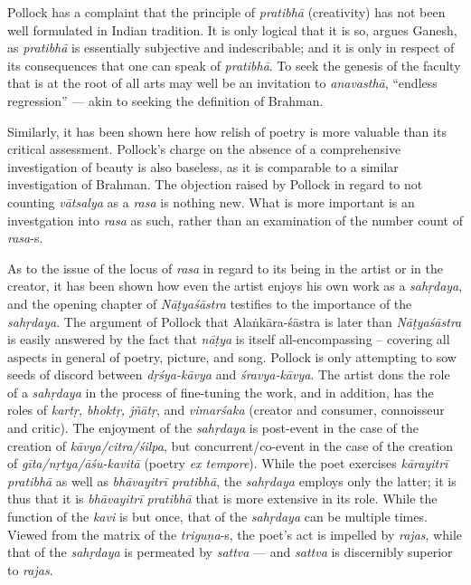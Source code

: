 Pollock has a complaint that the principle of \textsl{pratibhā} (creativity) has not been well formulated in Indian tradition. It is only logical that it is so, argues Ganesh, as \textsl{pratibhā} is essentially subjective and indescribable; and it is only in respect of its consequences that one can speak of \textsl{pratibhā}. To seek the genesis of the faculty that is at the root of all arts may well be an invitation to \textsl{anavasthā}, “endless regression” --- akin to seeking the definition of Brahman. 

Similarly, it has been shown here how relish of poetry is more valuable than its critical assessment. Pollock’s charge on the absence of a comprehensive investigation of beauty is also baseless, as it is comparable to a similar investigation of Brahman. The objection raised by Pollock in regard to not counting \textsl{vātsalya} as a \textsl{rasa} is nothing new. What is more important is an investgation into \textsl{rasa} as such, rather than an examination of the number count of \textsl{rasa}-s.

As to the issue of the locus of \textsl{rasa} in regard to its being in the artist or in the creator, it has been shown how even the artist enjoys his own work as a \textsl{sahṛdaya}, and the opening chapter of \textsl{Nāṭyaśāstra} testifies to the importance of the \textsl{sahṛdaya}. The argument of Pollock that Alaṅkāra-śāstra is later than \textsl{Nāṭyaśāstra} is easily answered by the fact that \textsl{nāṭya} is itself all-encompassing -- covering all aspects in general of poetry, picture, and song. Pollock is only attempting to sow seeds of discord between \textsl{dṛśya-kāvya} and \textsl{śravya-kāvya}. The artist dons the role of a \textsl{sahṛdaya} in the process of fine-tuning the work, and in addition, has the roles of \textsl{kartṛ, bhoktṛ, jñātṛ}, and \textsl{vimarśaka} (creator and consumer, connoisseur and critic). The enjoyment of the \textsl{sahṛdaya} is post-event in the case of the creation of \textsl{kāvya/citra/śilpa}, but concurrent/co-event in the case of the creation of \textsl{gīta/nṛtya/āśu-kavitā} (poetry \textsl{ex tempore}). While the poet exercises \textsl{kārayitrī pratibhā} as well as \textsl{bhāvayitrī pratibhā}, the \textsl{sahṛdaya} employs only the latter; it is thus that it is \textsl{bhāvayitrī pratibhā} that is more extensive in its role. While the function of the \textsl{kavi} is but once, that of the \textsl{sahṛdaya} can be multiple times. Viewed from the matrix of the \textsl{triguṇa}-s, the poet's act is impelled by \textsl{rajas}, while that of the \textsl{sahṛdaya} is permeated by \textsl{sattva} --- and \textsl{sattva} is discernibly superior to \textsl{rajas}.

